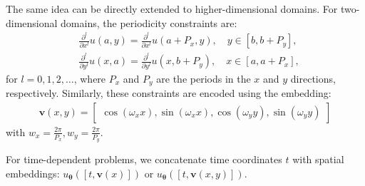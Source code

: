 The same idea can be directly extended to higher-dimensional domains. For two-dimensional domains, the periodicity constraints are:
\begin{align}
    &\frac{\partial^{l}}{\partial x^{l}} u\left(a, y\right)=\frac{\partial^{l}}{\partial x^{l}} u\left(a + P_x, y\right), \quad  y \in\left[b, b + P_y\right], \\
    &\frac{\partial^{l}}{\partial y^{l}} u\left(x, a\right)=\frac{\partial^{l}}{\partial y^{l}} u\left(x, b + P_y\right), \quad  x \in\left[a, a + P_x\right],
\end{align}
for $l=0, 1, 2, \dots$, where  $P_x$  and $P_y$ are the periods in the $x$ and $y$ directions, respectively. Similarly, these constraints are encoded using the embedding:
\begin{align}
    \mathbf{v}(x, y) = \begin{bmatrix}
    \cos \left(\omega_{x} x\right), \sin \left(\omega_{x} x\right), \cos \left(\omega_{y} y\right),  \sin \left(\omega_{y} y\right)
    \end{bmatrix}
\end{align}
with $w_x = \frac{2 \pi}{P_x}, w_y = \frac{2 \pi}{P_y}$.

For time-dependent problems, we concatenate time coordinates $t$ with spatial embeddings: $u_{\mathbf{\theta}}([t, \mathbf{v}(x)])$ or $u_{\mathbf{\theta}}([t, \mathbf{v}(x, y)])$. 





